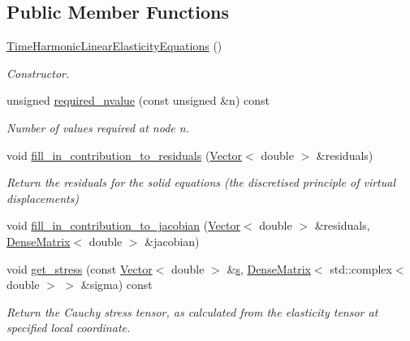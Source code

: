 \subsection*{Public Member Functions}
\begin{DoxyCompactItemize}
\item 
\hyperlink{classoomph_1_1TimeHarmonicLinearElasticityEquations_aded4f05223218f5b23728d85a15c743b}{Time\+Harmonic\+Linear\+Elasticity\+Equations} ()
\begin{DoxyCompactList}\small\item\em Constructor. \end{DoxyCompactList}\item 
unsigned \hyperlink{classoomph_1_1TimeHarmonicLinearElasticityEquations_a5d00cc9bc6e465257ae9fcae3a48393a}{required\+\_\+nvalue} (const unsigned \&n) const
\begin{DoxyCompactList}\small\item\em Number of values required at node n. \end{DoxyCompactList}\item 
void \hyperlink{classoomph_1_1TimeHarmonicLinearElasticityEquations_aed703e899b784e5bb2a0c7b9d8291d42}{fill\+\_\+in\+\_\+contribution\+\_\+to\+\_\+residuals} (\hyperlink{classoomph_1_1Vector}{Vector}$<$ double $>$ \&residuals)
\begin{DoxyCompactList}\small\item\em Return the residuals for the solid equations (the discretised principle of virtual displacements) \end{DoxyCompactList}\item 
void \hyperlink{classoomph_1_1TimeHarmonicLinearElasticityEquations_a546ed8d0a485289fa94c0835be57a771}{fill\+\_\+in\+\_\+contribution\+\_\+to\+\_\+jacobian} (\hyperlink{classoomph_1_1Vector}{Vector}$<$ double $>$ \&residuals, \hyperlink{classoomph_1_1DenseMatrix}{Dense\+Matrix}$<$ double $>$ \&jacobian)
\item 
void \hyperlink{classoomph_1_1TimeHarmonicLinearElasticityEquations_a46807604989766db0dd54dd8ff457021}{get\+\_\+stress} (const \hyperlink{classoomph_1_1Vector}{Vector}$<$ double $>$ \&\hyperlink{cfortran_8h_ab7123126e4885ef647dd9c6e3807a21c}{s}, \hyperlink{classoomph_1_1DenseMatrix}{Dense\+Matrix}$<$ std\+::complex$<$ double $>$ $>$ \&sigma) const
\begin{DoxyCompactList}\small\item\em Return the Cauchy stress tensor, as calculated from the elasticity tensor at specified local coordinate. \end{DoxyCompactList}\item 

\end{DoxyCompactItemize}
